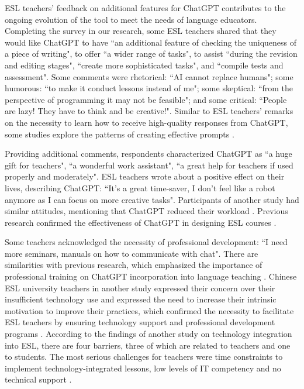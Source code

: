 \documentclass[english]{textolivre}
\begin{document}
ESL teachers’ feedback on additional features for ChatGPT contributes to the ongoing evolution of the tool to meet the needs of language educators. Completing the survey in our research, some ESL teachers shared that they would like ChatGPT to have ``an additional feature of checking the uniqueness of a piece of writing", to offer ``a wider range of tasks", to assist ``during the revision and editing stages", ``create more sophisticated tasks", and ``compile tests and assessment". Some comments were rhetorical: ``AI cannot replace humans"; some humorous: ``to make it conduct lessons instead of me"; some skeptical: ``from the perspective of programming it may not be feasible"; and some critical: ``People are lazy! They have to think and be creative!". Similar to ESL teachers’ remarks on the necessity to learn how to receive high-quality responses from ChatGPT, some studies explore the patterns of creating effective prompts \cite{herfteducator2023, kim2023, kostka2023}.

Providing additional comments, respondents characterized ChatGPT as ``a huge gift for teachers", ``a wonderful work assistant", ``a great help for teachers if used properly and moderately". ESL teachers wrote about a positive effect on their lives, describing ChatGPT: ``It’s a great time-saver, I don’t feel like a robot anymore as I can focus on more creative tasks". Participants of another study had similar attitudes, mentioning that ChatGPT reduced their workload \cite[p. 38]{nguyen2023}. Previous research confirmed the effectiveness of ChatGPT in designing ESL courses \cite[p. 85]{kim2023}.

Some teachers acknowledged the necessity of professional development: ``I need more seminars, manuals on how to communicate with chat". There are similarities with previous research, which emphasized the importance of professional training on ChatGPT incorporation into language teaching \cite[p. 19]{nguyen2023}. Chinese ESL university teachers in another study expressed their concern over their insufficient technology use and expressed the need to increase their intrinsic motivation to improve their practices, which confirmed the necessity to facilitate ESL teachers by ensuring technology support and professional development programs \cite[p. 83]{huang2019}. According to the findings of another study on technology integration into ESL, there are four barriers, three of which are related to teachers and one to students. The most serious challenges for teachers were time constraints to implement technology-integrated lessons, low levels of IT competency and no technical support \cite[p. 30]{hsu2016}.
\end{document}
